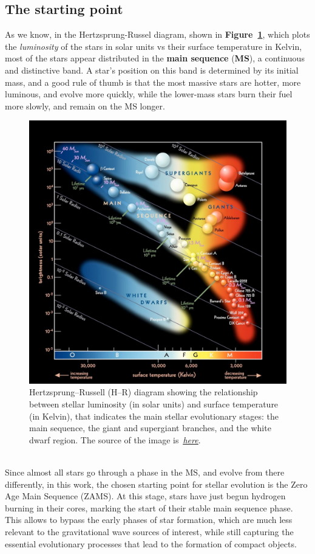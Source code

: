 \subsection{The starting point}
As we know, in the Hertzsprung-Russel diagram, shown in \textbf{Figure~\ref{fig: Hertzsprung_Russel_Diagram}}, which plots the \textit{luminosity} of the stars in solar units vs their surface temperature in Kelvin, most of the stars appear distributed in the \textbf{main sequence} (\textbf{MS}), a continuous and distinctive band.
A star's position on this band is determined by its initial mass, and a good rule of thumb is that the most massive stars are hotter, more luminous, and evolve more quickly, while the lower-mass stars burn their fuel more slowly, and remain on the MS longer.
\begin{figure}[h!]
    \begin{center}
        \includegraphics[width=\textwidth]{images/Hertzsprung_Russel_Diagram.jpg}
    \end{center}
    \caption{Hertzsprung–Russell (H–R) diagram showing the relationship between stellar luminosity (in solar units) and surface temperature (in Kelvin), that indicates the main stellar evolutionary stages: the main sequence, the giant and supergiant branches, and the white dwarf region.
    The source of the image is~\href{https://asktheman.xyz/}{\textit{\underline{here}}}.}\label{fig: Hertzsprung_Russel_Diagram}
\end{figure}\\
Since almost all stars go through a phase in the MS, and evolve from there differently, in this work, the chosen starting point for stellar evolution is the Zero Age Main Sequence (ZAMS). 
At this stage, stars have just begun hydrogen burning in their cores, marking the start of their stable main sequence phase.
This allows to bypass the early phases of star formation, which are much less relevant to the gravitational wave sources of interest, while still capturing the essential evolutionary processes that lead to the formation of compact objects.

